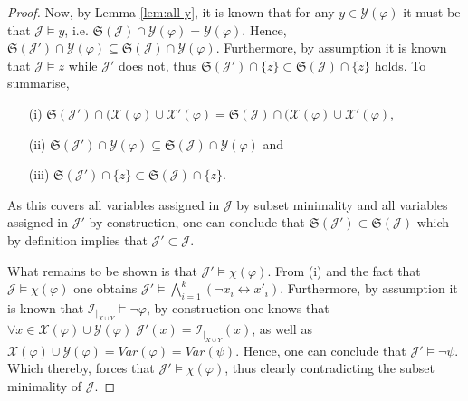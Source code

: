 \documentclass [11pt]{article}
\newcommand{\var}{\mathit{Var}}
\begin{document}
\begin{proof}
Now, by Lemma \ref{lem:all-y}, it is known that for any $y \in \mathcal{Y}(\varphi)$ it must be that $\mathcal{J}\models y$, i.e. $\mathfrak{S}(\mathcal{J}) \cap  \mathcal{Y}(\varphi)= \mathcal{Y}(\varphi)$. Hence, $\mathfrak{S}(\mathcal{J}') \cap \mathcal{Y}(\varphi) \subseteq \mathfrak{S}(\mathcal{J}) \cap \mathcal{Y}(\varphi)$. Furthermore, by assumption it is known that $\mathcal{J} \models z$ while $\mathcal{J}'$ does not, thus $\mathfrak{S}(\mathcal{J}') \cap \{z\} \subset \mathfrak{S}(\mathcal{J}) \cap\{z\}$ holds. To summarise, 
\begin{enumerate}
\item[(i)] $\mathfrak{S}(\mathcal{J}') \cap (\mathcal{X}(\varphi)\cup \mathcal{X}'(\varphi)=\mathfrak{S}(\mathcal{J}) \cap (\mathcal{X}(\varphi)\cup \mathcal{X}'(\varphi)$,
\item[(ii)] $\mathfrak{S}(\mathcal{J}') \cap \mathcal{Y}(\varphi) \subseteq \mathfrak{S}(\mathcal{J}) \cap \mathcal{Y}(\varphi)$ and 
\item[(iii)] $\mathfrak{S}(\mathcal{J}') \cap \{z\} \subset \mathfrak{S}(\mathcal{J}) \cap\{z\}$.
\end{enumerate}

As this covers all variables assigned in $\mathcal{J}$ by subset minimality and all variables assigned in $\mathcal{J}'$ by construction, one can conclude that $\mathfrak{S}(\mathcal{J}')  \subset \mathfrak{S}(\mathcal{J})$ which by definition implies that $\mathcal{J}'\subset\mathcal{J}$.


What remains to be shown is that $\mathcal{J}' \models \chi(\varphi)$. From (i) and the fact that $\mathcal{J} \models \chi(\varphi)$ one obtains $\mathcal{J}' \models \bigwedge_{i=1}^k (\neg x_i \leftrightarrow x'_i)$. Furthermore, by assumption it is known that $\mathcal{I}_{|_{X\cup Y}} \models \neg \varphi$, by construction one knows that $\forall x \in \mathcal{X}(\varphi)\cup \mathcal{Y}(\varphi)\; \mathcal{J}'(x)=\mathcal{I}_{|_{X\cup Y}}(x) $, as well as  $\mathcal{X}(\varphi)\cup \mathcal{Y}(\varphi)= \var(\varphi)=\var(\psi)$. Hence, one can conclude that $\mathcal{J}' \models \neg \psi$.
Which thereby, forces that $\mathcal{J}' \models \chi(\varphi)$, thus clearly contradicting the subset minimality of $\mathcal{J}$. 


\end{proof}
\end{document}

